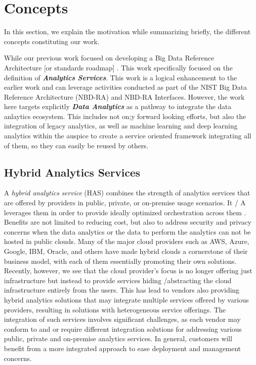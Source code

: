 

\section{Concepts}\label{s:background}

In this section, we explain the motivation while summarizing briefly,
the different concepts constituting our work.

While our previous work focused on developing a Big Data Reference
Architecture [or standards roadmap] \cite{vol8}. This work
specifically focused on the definition of {\bf\em Analytics Services}.
This work is a logical enhancement to the earlier work and can
leverage activities conducted as part of the NIST Big Data Reference
Architecture (NBD-RA) and NBD-RA Interfaces.  However, the work here
targets explicitly {\bf\em Data Analytics} as a pathway to integrate
the data anlaytics ecosystem. This includes not on;y forward looking
efforts, but also the integration of legacy analytics, as well as
machine learning and deep learning analytics within the auspice to
create a service oriented framework integrating all of them, so they
can easily be reused by others.


\subsection{Hybrid Analytics Services}

A {\em hybrid analytics service} (HAS) combines the strength of analytics
services that are offered by providers in public, private, or
on-premise usage scenarios. It / A \TODO{[HAS]} leverages them \TODO{[x]} in order to provide ideally optimized
orchestration across them \TODO{[x]}. Benefits are not limited to reducing cost,
but also to address security and privacy concerns when the data
analytics or the data to perform the analytics can not be hosted in
public clouds. Many of the major cloud providers such as AWS, Azure,
Google, IBM, Oracle, and others have made hybrid clouds a cornerstone
of their business model, with each of them essentially promoting their own
solutions. Recently, however, we see that the cloud provider's focus is no longer
offering just infrastructure but instead to provide services hiding /abstracting the
cloud infrastructure entirely from the users. 
This has lead to vendors
also providing hybrid analytics solutions that may integrate
multiple services offered by various providers, resulting in solutions
with heterogeneous service offerings. The integration of such services
involves significant challenges, as each vendor may conform to and or require different
integration solutions for addressing various public, private and on-premise
analytics services. In general, customers will benefit from a more
integrated approach to ease deployment and management concerns.

